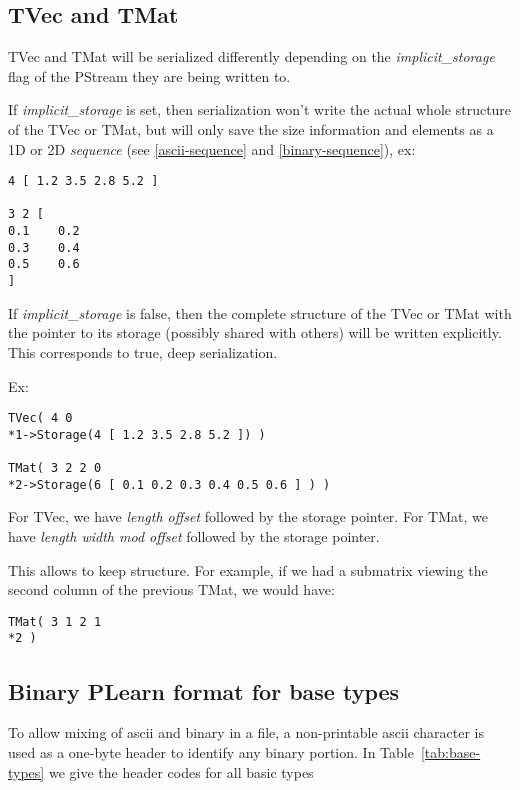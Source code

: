 \documentclass[11pt]{book}
\begin{document}
\subsection{TVec and TMat}

TVec and TMat will be serialized differently depending on the {\em
implicit\_storage} flag of the PStream they are being written to.

If {\em implicit\_storage} is set, then serialization won't write the actual
whole structure of the TVec or TMat, but will only save the size information
and elements as a 1D or 2D {\em sequence} (see \ref{ascii-sequence} and
\ref{binary-sequence}), ex:

\begin{verbatim}
4 [ 1.2 3.5 2.8 5.2 ]

3 2 [
0.1    0.2
0.3    0.4
0.5    0.6
]
\end{verbatim}

If {\em implicit\_storage} is false, then the complete structure of the
TVec or TMat with the pointer to its storage (possibly shared with others)
will be written explicitly. This corresponds to true, deep serialization.

Ex:

\begin{verbatim}
TVec( 4 0 
*1->Storage(4 [ 1.2 3.5 2.8 5.2 ]) )

TMat( 3 2 2 0 
*2->Storage(6 [ 0.1 0.2 0.3 0.4 0.5 0.6 ] ) )
\end{verbatim}

For TVec, we have {\em length offset} followed by the storage pointer.
For TMat, we have {\em length width mod offset} followed by the storage pointer.

This allows to keep structure. For example, if we had a submatrix viewing
the second column of the previous TMat, we would have:

\begin{verbatim}
TMat( 3 1 2 1
*2 )
\end{verbatim}

\subsection{Binary PLearn format for base types}

To allow mixing of ascii and binary in a file, a non-printable ascii
character is used as a one-byte header to identify any binary portion.  In
Table~\ref{tab:base-types} we give the header codes for all basic types
\end{document}
